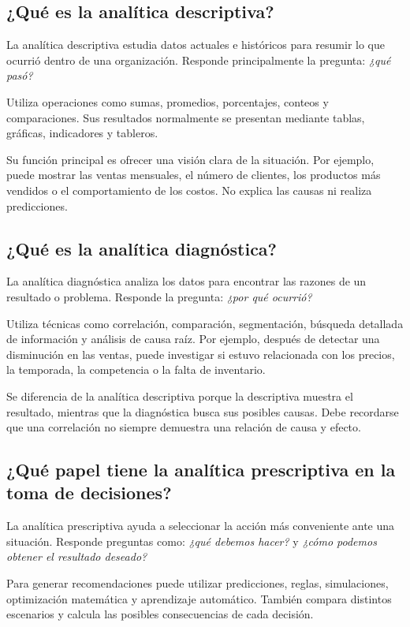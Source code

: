 \subsection{¿Qué es la analítica descriptiva?}

La analítica descriptiva estudia datos actuales e históricos para resumir lo
que ocurrió dentro de una organización. Responde principalmente la pregunta:
\textit{¿qué pasó?}

Utiliza operaciones como sumas, promedios, porcentajes, conteos y
comparaciones. Sus resultados normalmente se presentan mediante tablas,
gráficas, indicadores y tableros.

Su función principal es ofrecer una visión clara de la situación. Por ejemplo,
puede mostrar las ventas mensuales, el número de clientes, los productos más
vendidos o el comportamiento de los costos. No explica las causas ni realiza
predicciones.

\subsection{¿Qué es la analítica diagnóstica?}

La analítica diagnóstica analiza los datos para encontrar las razones de un
resultado o problema. Responde la pregunta: \textit{¿por qué ocurrió?}

Utiliza técnicas como correlación, comparación, segmentación, búsqueda
detallada de información y análisis de causa raíz. Por ejemplo, después de
detectar una disminución en las ventas, puede investigar si estuvo relacionada
con los precios, la temporada, la competencia o la falta de inventario.

Se diferencia de la analítica descriptiva porque la descriptiva muestra el
resultado, mientras que la diagnóstica busca sus posibles causas. Debe
recordarse que una correlación no siempre demuestra una relación de causa y
efecto.

\subsection{¿Qué papel tiene la analítica prescriptiva en la toma de decisiones?}

La analítica prescriptiva ayuda a seleccionar la acción más conveniente ante
una situación. Responde preguntas como: \textit{¿qué debemos hacer?} y
\textit{¿cómo podemos obtener el resultado deseado?}

Para generar recomendaciones puede utilizar predicciones, reglas, simulaciones,
optimización matemática y aprendizaje automático. También compara distintos
escenarios y calcula las posibles consecuencias de cada decisión.

